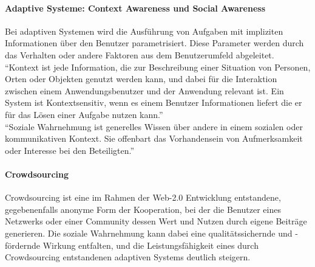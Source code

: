 \paragraph{Adaptive Systeme: Context Awareness und Social Awareness}
Bei adaptiven Systemen wird die Ausführung von Aufgaben mit impliziten Informationen über den Benutzer parametrisiert. Diese Parameter werden durch das Verhalten oder andere Faktoren aus dem Benutzerumfeld
abgeleitet.\\ 
"`Kontext ist jede Information, die zur Beschreibung einer Situation von Personen, Orten oder Objekten genutzt werden kann, und dabei für die Interaktion zwischen einem Anwendungsbenutzer und der Anwendung relevant ist. Ein System ist Kontextsensitiv, wenn es einem Benutzer Informationen liefert die er für das Lösen einer Aufgabe  nutzen kann."'\cite{COMPASS:AH}\\
"`Soziale Wahrnehmung ist generelles Wissen über andere in einem sozialen oder kommunikativen Kontext. Sie offenbart das Vorhandensein von Aufmerksamkeit oder Interesse bei den Beteiligten."'\cite{UNIGE:KOA}

\paragraph{Crowdsourcing}
Crowdsourcing ist eine im Rahmen der Web-2.0 Entwicklung entstandene, gegebenenfalls anonyme Form der Kooperation, bei der die Benutzer eines Netzwerks oder einer Community dessen Wert und Nutzen durch eigene Beiträge generieren. Die soziale Wahrnehmung kann dabei eine qualitätssichernde und -fördernde Wirkung entfalten, und die Leistungsfähigkeit eines durch Crowdsourcing entstandenen adaptiven Systems deutlich steigern.

\enlargethispage{3\baselineskip} %
